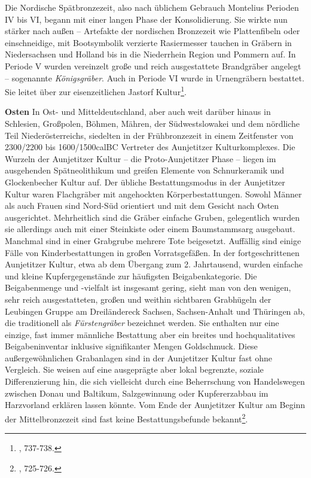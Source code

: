 \documentclass[openany,twoside,twocolumn]{book}
\let\rmarkdownfootnote\footnote%
\def\footnote{\protect\rmarkdownfootnote}
\begin{document}
Die Nordische Spätbronzezeit, also nach üblichem Gebrauch Montelius Perioden IV bis VI, begann mit einer langen Phase der Konsolidierung. Sie wirkte nun stärker nach außen -- Artefakte der nordischen Bronzezeit wie Plattenfibeln oder einschneidige, mit Bootsymbolik verzierte Rasiermesser tauchen in Gräbern in Niedersachsen und Holland bis in die Niederrhein Region und Pommern auf. In Periode V wurden vereinzelt große und reich ausgestattete Brandgräber angelegt -- sogenannte \emph{Königsgräber}. Auch in Periode VI wurde in Urnengräbern bestattet. Sie leitet über zur eisenzeitlichen Jastorf Kultur\footnote{\textcite{jockenhovel_germany_2013}, 737-738.}.

\textbf{Osten} \newline 
In Ost- und Mitteldeutschland, aber auch weit darüber hinaus in Schlesien, Großpolen, Böhmen, Mähren, der Südwestslowakei und dem nördliche Teil Niederösterreichs, siedelten in der Frühbronzezeit in einem Zeitfenster von 2300/2200 bis 1600/1500calBC Vertreter des Aunjetitzer Kulturkomplexes. Die Wurzeln der Aunjetitzer Kultur -- die Proto-Aunjetitzer Phase -- liegen im ausgehenden Spätneolithikum und greifen Elemente von Schnurkeramik und Glockenbecher Kultur auf. Der übliche Bestattungsmodus in der Aunjetitzer Kultur waren Flachgräber mit angehockten Körperbestattungen. Sowohl Männer als auch Frauen sind Nord-Süd orientiert und mit dem Gesicht nach Osten ausgerichtet. Mehrheitlich sind die Gräber einfache Gruben, gelegentlich wurden sie allerdings auch mit einer Steinkiste oder einem Baumstammsarg ausgebaut. Manchmal sind in einer Grabgrube mehrere Tote beigesetzt. Auffällig sind einige Fälle von Kinderbestattungen in großen Vorratsgefäßen. In der fortgeschrittenen Aunjetitzer Kultur, etwa ab dem Übergang zum 2. Jahrtausend, wurden einfache und kleine Kupfergegenstände zur häufigsten Beigabenkategorie. Die Beigabenmenge und -vielfalt ist insgesamt gering, sieht man von den wenigen, sehr reich ausgestatteten, großen und weithin sichtbaren Grabhügeln der Leubingen Gruppe am Dreiländereck Sachsen, Sachsen-Anhalt und Thüringen ab, die traditionell als \emph{Fürstengräber} bezeichnet werden. Sie enthalten nur eine einzige, fast immer männliche Bestattung aber ein breites und hochqualitatives Beigabeninventar inklusive signifikanter Mengen Goldschmuck. Diese außergewöhnlichen Grabanlagen sind in der Aunjetitzer Kultur fast ohne Vergleich. Sie weisen auf eine ausgeprägte aber lokal begrenzte, soziale Differenzierung hin, die sich vielleicht durch eine Beherrschung von Handelswegen zwischen Donau und Baltikum, Salzgewinnung oder Kupfererzabbau im Harzvorland erklären lassen könnte. Vom Ende der Aunjetitzer Kultur am Beginn der Mittelbronzezeit sind fast keine Bestattungsbefunde bekannt\footnote{\textcite{jockenhovel_germany_2013}, 725-726.}.
\end{document}
